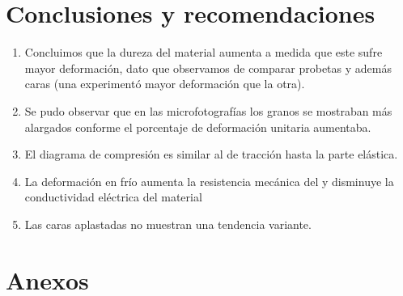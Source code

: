 \documentclass[a4paper,12pt]{report}
\begin{document}
\chapter{Conclusiones y recomendaciones}
\begin{enumerate}
\item Concluimos que la dureza del material aumenta a medida que este sufre mayor deformación, dato que observamos de comparar probetas y además caras (una experimentó mayor deformación que la otra).
\item Se pudo observar que en las microfotografías los granos se mostraban más alargados conforme el porcentaje de deformación unitaria aumentaba.
\item El diagrama de compresión es similar al de tracción hasta la parte elástica.
\item La deformación en frío aumenta la resistencia mecánica del y disminuye la conductividad eléctrica del material
\item Las caras aplastadas no muestran una tendencia variante.
\end{enumerate}
\chapter{Anexos}
\end{document}
